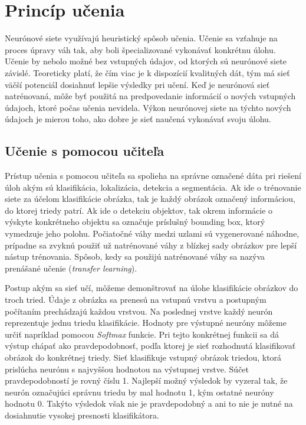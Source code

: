 
\section{Princíp učenia}

Neurónové siete využívajú heuristický spôsob učenia. Učenie sa vzťahuje na proces úpravy váh tak, aby boli špecializované vykonávať konkrétnu úlohu. Učenie by nebolo možné bez vstupných údajov, od ktorých sú neurónové siete závislé. Teoreticky platí, že čím viac je k dispozícií kvalitných dát, tým má sieť väčší potenciál dosiahnuť lepšie výsledky pri učení. Keď je neurónová sieť natrénovaná, môže byť použitá na predpovedanie informácií o nových vstupných údajoch, ktoré počas učenia nevidela. Výkon neurónovej siete na týchto nových údajoch je mierou toho, ako dobre je sieť naučená vykonávať svoju úlohu.

\subsection{Učenie s pomocou učiteľa}
Prístup učenia s pomocou učiteľa sa spolieha na správne označené dáta pri riešení úloh akým sú klasifikácia, lokalizácia, detekcia a segmentácia. Ak ide o trénovanie siete za účelom klasifikácie obrázka, tak je každý obrázok označený informáciou, do ktorej triedy patrí. Ak ide o detekciu objektov, tak okrem informácie o výskyte konkrétneho objektu sa označuje príslušný bounding box, ktorý vymedzuje jeho polohu. Počiatočné váhy medzi uzlami sú vygenerované náhodne, prípadne sa zvyknú použiť už natrénované váhy z blízkej sady obrázkov pre lepší nástup trénovania. Spôsob, kedy sa použijú natrénované váhy sa nazýva prenášané učenie (\textit{transfer learning}). 

Postup akým sa sieť učí, môžeme demonštrovať na úlohe klasifikácie obrázkov do troch tried. Údaje z obrázka sa prenesú na vstupnú vrstvu a postupným počítaním prechádzajú každou vrstvou. Na poslednej vrstve každý neurón reprezentuje jednu triedu klasifikácie. Hodnoty pre výstupné neuróny môžeme určiť napríklad pomocou \textit{Softmax} funkcie. Pri tejto konkrétnej funkcii sa dá výstup chápať ako pravdepodobnosť, podľa ktorej je sieť rozhodnutá klasifikovať obrázok do konkrétnej triedy. Sieť klasifikuje vstupný obrázok triedou, ktorá prislúcha neurónu s najvyššou hodnotou na výstupnej vrstve. Súčet pravdepodobností je rovný číslu 1. Najlepší možný výsledok by vyzeral tak, že neurón označujúci správnu triedu by mal hodnotu 1, kým ostatné neuróny hodnotu 0. Takýto výsledok však nie je pravdepodobný a ani to nie je nutné na dosiahnutie vysokej presnosti klasifikátora.

